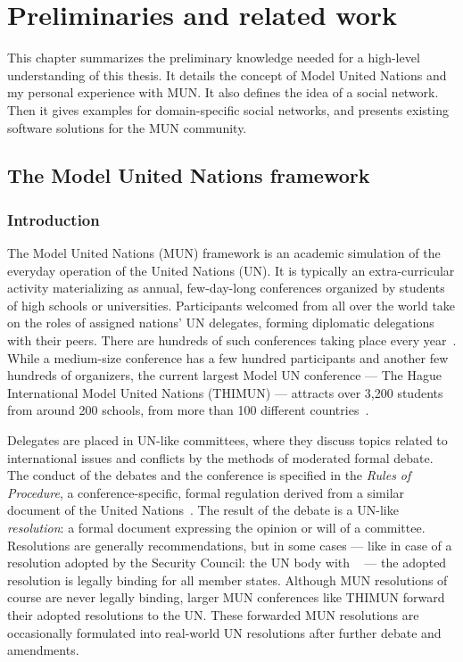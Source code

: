 \chapter{Preliminaries and related work}
\label{chapter:preliminaries}

This chapter summarizes the preliminary knowledge needed for a high-level understanding of this thesis. It details the concept of Model United Nations and my personal experience with MUN. It also defines the idea of a social network. Then it gives examples for domain-specific social networks, and presents existing software solutions for the MUN community.

\section{The Model United Nations framework}
\label{section:munframework}

\subsection{Introduction}

The Model United Nations (MUN) framework is an academic simulation of the everyday operation of the United Nations (UN). It is typically an extra-curricular activity materializing as annual, few-day-long conferences organized by students of high schools or universities. Participants welcomed from all over the world take on the roles of assigned nations' UN delegates, forming diplomatic delegations with their peers. There are hundreds of such conferences taking place every year~\cite{mymunconferencelist}. While a medium-size conference has a few hundred participants and another few hundreds of organizers, the current largest Model UN conference — The Hague International Model United Nations (THIMUN) — attracts over 3,200 students from around 200 schools, from more than 100 different countries~\cite{thimunabout}.

Delegates are placed in UN-like committees, where they discuss topics related to international issues and conflicts by the methods of moderated formal debate. The conduct of the debates and the conference is specified in the \emph{Rules of Procedure}, a conference-specific, formal regulation derived from a similar document of the United Nations~\cite{unmunrop}. The result of the debate is a UN-like \emph{resolution}: a formal document expressing the opinion or will of a committee. Resolutions are generally recommendations, but in some cases — like in case of a resolution adopted by the Security Council: the UN body with ~\cite{uncharter} — the adopted resolution is legally binding for all member states. Although MUN resolutions of course are never legally binding, larger MUN conferences like THIMUN forward their adopted resolutions to the UN. These forwarded MUN resolutions are occasionally formulated into real-world UN resolutions after further debate and amendments.

